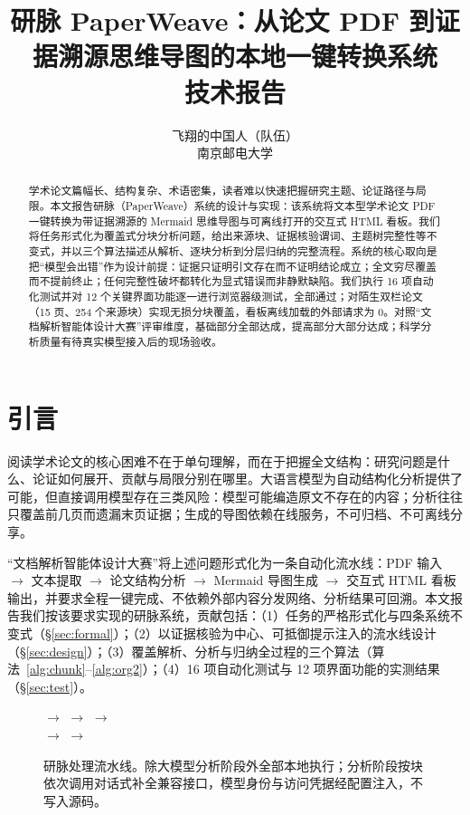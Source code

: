 \documentclass[11pt]{article}
\title{研脉 PaperWeave：从论文 PDF 到证据溯源思维导图的本地一键转换系统\\
{\large 技术报告}}
\author{飞翔的中国人（队伍） \\
  南京邮电大学}
\begin{document}
\maketitle

\begin{abstract}
学术论文篇幅长、结构复杂、术语密集，读者难以快速把握研究主题、论证路径与局限。本文报告研脉（PaperWeave）系统的设计与实现：该系统将文本型学术论文 PDF 一键转换为带证据溯源的 Mermaid 思维导图与可离线打开的交互式 HTML 看板。我们将任务形式化为覆盖式分块分析问题，给出来源块、证据核验谓词、主题树完整性等不变式，并以三个算法描述从解析、逐块分析到分层归纳的完整流程。系统的核心取向是把“模型会出错”作为设计前提：证据只证明引文存在而不证明结论成立；全文穷尽覆盖而不提前终止；任何完整性破坏都转化为显式错误而非静默缺陷。我们执行 16 项自动化测试并对 12 个关键界面功能逐一进行浏览器级测试，全部通过；对陌生双栏论文（15 页、254 个来源块）实现无损分块覆盖，看板离线加载的外部请求为 0。对照“文档解析智能体设计大赛”评审维度，基础部分全部达成，提高部分大部分达成；科学分析质量有待真实模型接入后的现场验收。
\end{abstract}

\section{引言}

阅读学术论文的核心困难不在于单句理解，而在于把握全文结构：研究问题是什么、论证如何展开、贡献与局限分别在哪里。大语言模型为自动结构化分析提供了可能，但直接调用模型存在三类风险：模型可能编造原文不存在的内容；分析往往只覆盖前几页而遗漏末页证据；生成的导图依赖在线服务，不可归档、不可离线分享。

“文档解析智能体设计大赛”将上述问题形式化为一条自动化流水线：PDF 输入 $\rightarrow$ 文本提取 $\rightarrow$ 论文结构分析 $\rightarrow$ Mermaid 导图生成 $\rightarrow$ 交互式 HTML 看板输出，并要求全程一键完成、不依赖外部内容分发网络、分析结果可回溯。本文报告我们按该要求实现的研脉系统，贡献包括：（1）任务的严格形式化与四条系统不变式（\S\ref{sec:formal}）；（2）以证据核验为中心、可抵御提示注入的流水线设计（\S\ref{sec:design}）；（3）覆盖解析、分析与归纳全过程的三个算法（算法~\ref{alg:chunk}--\ref{alg:org2}）；（4）16 项自动化测试与 12 项界面功能的实测结果（\S\ref{sec:test}）。

\begin{figure}[t]
\centering
{} $\rightarrow$
 $\rightarrow$
 $\rightarrow$
\\[4pt]
 $\rightarrow$
 $\rightarrow$
\caption{研脉处理流水线。除大模型分析阶段外全部本地执行；分析阶段按块依次调用对话式补全兼容接口，模型身份与访问凭据经配置注入，不写入源码。}
\label{fig:pipeline}
\end{figure}
\end{document}
